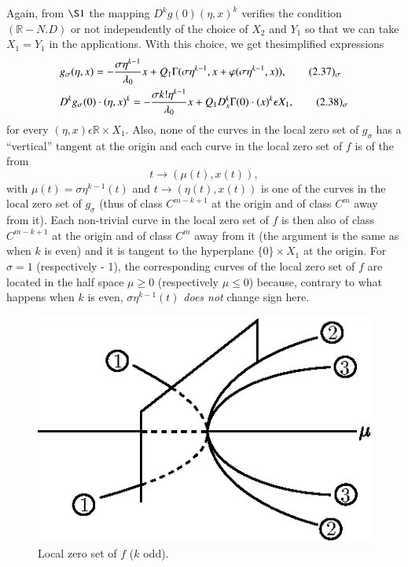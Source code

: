 Again, from $\S 1$ the mapping $D^{k}g(0)(\eta, x)^{k}$ verifies the
condition $(\mathbb{R}-N.D)$ or not independently of the choice of
$X_{2}$ and $Y_{1}$ so that we can take $X_{1} = Y_{1}$ in the
applications. With this choice, we get the\pageoriginale simplified
expressions
\begin{align*}
& g_{\sigma}(\eta, x) = -\frac{\sigma \eta^{k-1}}{\lambda_{0}} x +
Q_{1}\Gamma (\sigma \eta^{k-1}, x + \varphi (\sigma \eta^{k-1},
x)),\tag*{(2.37)$_{\sigma}$}\label{chap3-eq2.37}\\
& D^{k}g_{\sigma}(0) \cdot (\eta, x)^{k} = -\frac{\sigma k!
  \eta^{k-1}}{\lambda_{0}} x + Q_{1}D_{x}^{k}\Gamma(0) \cdot (x)^{k}
\epsilon X_{1},\tag*{(2.38)$_{\sigma}$}\label{chap3-eq2.38}
\end{align*}
for every $(\eta, x) \epsilon \mathbb{R} \times X_{1}$. Also, none of
the curves in the local zero set of $g_{\sigma}$ has a ``vertical''
tangent at the origin and each curve in the local zero set of $f$ is of
the from
$$
t \to (\mu(t), x(t)),
$$
with $\mu(t) = \sigma \eta^{k-1}(t)$ and $t \to (\eta(t), x(t))$ is
one of the curves in the local zero set of $g_{\sigma}$ (thus of class
$C^{m-k+1}$ at the origin and of class $C^{m}$ away from it). Each
non-trivial curve in the local zero set of $f$ is then also of class
$C^{m-k+1}$ at the origin and of class $C^{m}$ away from it (the
argument is the same as when $k$ is even) and it is tangent to the
hyperplane $\{0\} \times X_{1}$ at the origin. For $\sigma = 1$
(respectively - 1), the corresponding curves of the local zero set of
$f$ are located in the half space $\mu \geq 0$ (respectively $\mu \leq
0$) because, contrary to what happens when $k$ is even, $\sigma
\eta^{k-1}(t)$ {\em does not} change sign here.
\begin{figure}[H]
\centering
\includegraphics{figure/fig76-2.4.eps}
\caption{Local zero set of $f$ ($k$ odd).}
\end{figure}

